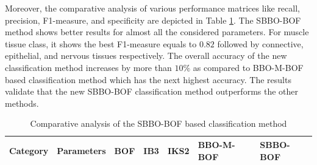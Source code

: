 Moreover, the comparative analysis of various performance matrices like recall, precision, F1-measure, and specificity are depicted in Table \ref{tab:perfor}.  The SBBO-BOF method shows better results for almost all the considered parameters. For muscle tissue class, it shows the best F1-measure equals to $0.82$ followed by connective, epithelial,  and nervous tissues respectively.  The overall accuracy of the new classification method increases by more than $10\%$ as compared to BBO-M-BOF based classification method which has the next highest accuracy. The results validate that the new SBBO-BOF classification method outperforms the other methods.

 \begin{table}[t]
\center
\scriptsize
    \caption[Comparative analysis of the SBBO-BOF based classification method]{\fontsize{10pt}{12pt}\selectfont Comparative analysis of the SBBO-BOF based classification method}
    \label{tab:perfor}
    {\renewcommand{\arraystretch}{1.2}
\begin{tabular}{|p{0.5in}|p{0.9in}|p{0.55in}|p{0.55in}|p{0.55in}|p{0.65in}|p{0.6in}|}
    \hline
  Category    &    Parameters    &    BOF    &    IB3    &    IKS2    &    BBO-M-BOF    &    SBBO-BOF    \\
 \hline


\end{tabular}}
\end{table}
